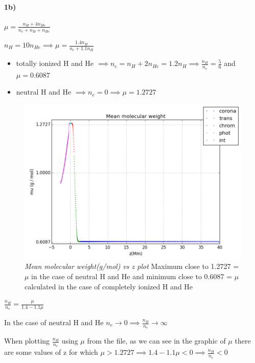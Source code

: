 \documentclass[10pt]{book}
\begin{document}
\paragraph {1b)}

$\mu = \frac{n_{H} + 4 n_{He}}{n_e + n_H + n_{He}} $

$n_H= 10 n_{He} \implies  \mu = \frac{1.4 n_H}{n_e + 1.1 n_H}$


\begin{itemize}
\item totally ionized H and He $\implies n_e = n_H + 2 n_{He} = 1.2 n_H \implies \frac{n_H}{n_e} = \frac{5}{6} $ and 
$ \mu = 0.6087 $
\item neutral H and He $\implies n_e = 0 \implies  \mu = 1.2727 $

\end{itemize}



\begin{figure}[H]
 \centering
 \includegraphics[scale=0.5]{mmmLayers.png}
 \caption{\emph{Mean molecular weight(g/mol) vs z plot} Maximum close to 1.2727 = $\mu$ in the case of neutral H and He and minimum close to 0.6087 = $\mu$ calculated in the case of completely ionized H and He }
\end{figure}

$\frac{n_H}{n_e} =  \frac{\mu}{1.4 - 1.1 \mu }   $

In the case of neutral H and He $n_e \rightarrow 0 \implies \frac{n_H}{n_e} \rightarrow \infty $

When plotting  $\frac{n_H}{n_e}$ using $\mu$ from the file, as we can see in the graphic of $\mu$ there are some values of z for which
$\mu > 1.2727 \implies 1.4 - 1.1 \mu < 0 \implies \frac{n_H}{n_e} < 0$
\end{document}
